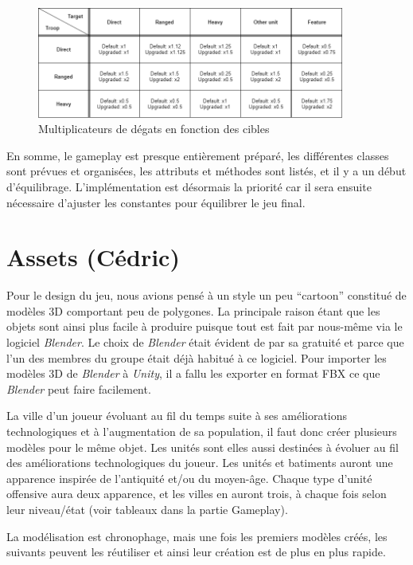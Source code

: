 \documentclass[12pt]{report}
\begin{document}
\begin{figure}[H]
    \centering
    \includegraphics[width=0.9\textwidth]{damage_multipliers}
    \caption{Multiplicateurs de dégats en fonction des cibles}
\end{figure}

En somme, le gameplay est presque entièrement préparé, les différentes classes sont prévues et organisées, les attributs et méthodes sont listés, et il y a un début d’équilibrage. L'implémentation est désormais la priorité car il sera ensuite nécessaire d'ajuster les constantes pour équilibrer le jeu final.

\section{Assets (Cédric)}

Pour le design du jeu, nous avions pensé à un style un peu “cartoon” constitué de modèles 3D comportant peu de polygones. La principale raison étant que les objets sont ainsi plus facile à produire puisque tout est fait par nous-même via le logiciel \textit{Blender}. Le choix de \textit{Blender} était évident de par sa gratuité et parce que l’un des membres du groupe était déjà habitué à ce logiciel. Pour importer les modèles 3D de \textit{Blender} à \textit{Unity}, il a fallu les exporter en format FBX ce que \textit{Blender} peut faire facilement.

La ville d’un joueur évoluant au fil du temps suite à ses améliorations technologiques et à l’augmentation de sa population, il faut donc créer plusieurs modèles pour le même objet. Les unités sont elles aussi destinées à évoluer au fil des améliorations technologiques du joueur. Les unités et batiments auront une apparence inspirée de l'antiquité et/ou du moyen-âge. Chaque type d'unité offensive aura deux apparence, et les villes en auront trois, à chaque fois selon leur niveau/état (voir tableaux dans la partie Gameplay).

\newpage

La modélisation est chronophage, mais une fois les premiers modèles créés, les suivants peuvent les réutiliser et ainsi leur création est de plus en plus rapide.
\end{document}
